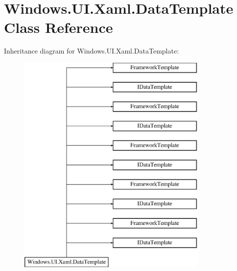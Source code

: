 \hypertarget{class_windows_1_1_u_i_1_1_xaml_1_1_data_template}{}\section{Windows.\+U\+I.\+Xaml.\+Data\+Template Class Reference}
\label{class_windows_1_1_u_i_1_1_xaml_1_1_data_template}
Inheritance diagram for Windows.\+U\+I.\+Xaml.\+Data\+Template\+:\begin{figure}[H]
\begin{center}
\leavevmode
\includegraphics[height=11.000000cm]{class_windows_1_1_u_i_1_1_xaml_1_1_data_template}
\end{center}
\end{figure}
